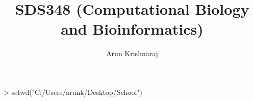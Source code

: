 \documentclass[12pt]{article}
\begin{document}

\raggedright
\title{SDS348 (Computational Biology and Bioinformatics)}
\author{Arun Krishnaraj}
\maketitle
\begin{Schunk}
\begin{Sinput}
> setwd("C:/Users/arunk/Desktop/School")
\end{Sinput}
\end{Schunk}
\end{document}
